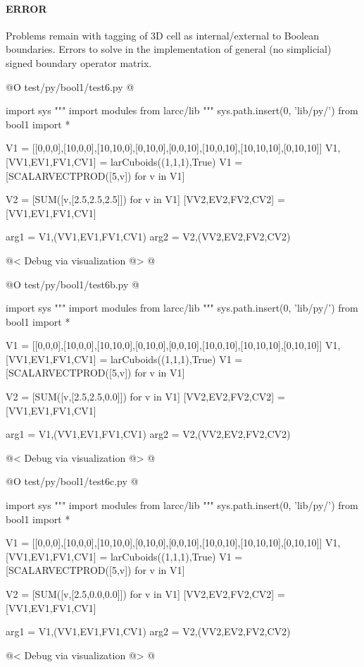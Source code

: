 \documentclass[11pt,oneside]{article}	%
\begin{document}

\paragraph{ERROR}

Problems remain with tagging of 3D cell as internal/external to Boolean boundaries. Errors to solve in the implementation of  general (no simplicial) signed boundary operator matrix.


@O test/py/bool1/test6.py
@{
import sys
""" import modules from larcc/lib """
sys.path.insert(0, 'lib/py/')
from bool1 import *

V1 = [[0,0,0],[10,0,0],[10,10,0],[0,10,0],[0,0,10],[10,0,10],[10,10,10],[0,10,10]]
V1,[VV1,EV1,FV1,CV1] = larCuboids((1,1,1),True)
V1 = [SCALARVECTPROD([5,v]) for v in V1]

V2 = [SUM([v,[2.5,2.5,2.5]]) for v in V1]
[VV2,EV2,FV2,CV2] = [VV1,EV1,FV1,CV1]

arg1 = V1,(VV1,EV1,FV1,CV1)
arg2 = V2,(VV2,EV2,FV2,CV2)

@< Debug via visualization @>
@}
@O test/py/bool1/test6b.py
@{
import sys
""" import modules from larcc/lib """
sys.path.insert(0, 'lib/py/')
from bool1 import *

V1 = [[0,0,0],[10,0,0],[10,10,0],[0,10,0],[0,0,10],[10,0,10],[10,10,10],[0,10,10]]
V1,[VV1,EV1,FV1,CV1] = larCuboids((1,1,1),True)
V1 = [SCALARVECTPROD([5,v]) for v in V1]

V2 = [SUM([v,[2.5,2.5,0.0]]) for v in V1]
[VV2,EV2,FV2,CV2] = [VV1,EV1,FV1,CV1]

arg1 = V1,(VV1,EV1,FV1,CV1)
arg2 = V2,(VV2,EV2,FV2,CV2)

@< Debug via visualization @>
@}
@O test/py/bool1/test6c.py
@{
import sys
""" import modules from larcc/lib """
sys.path.insert(0, 'lib/py/')
from bool1 import *

V1 = [[0,0,0],[10,0,0],[10,10,0],[0,10,0],[0,0,10],[10,0,10],[10,10,10],[0,10,10]]
V1,[VV1,EV1,FV1,CV1] = larCuboids((1,1,1),True)
V1 = [SCALARVECTPROD([5,v]) for v in V1]

V2 = [SUM([v,[2.5,0.0,0.0]]) for v in V1]
[VV2,EV2,FV2,CV2] = [VV1,EV1,FV1,CV1]

arg1 = V1,(VV1,EV1,FV1,CV1)
arg2 = V2,(VV2,EV2,FV2,CV2)

@< Debug via visualization @>
@}
\end{document}
